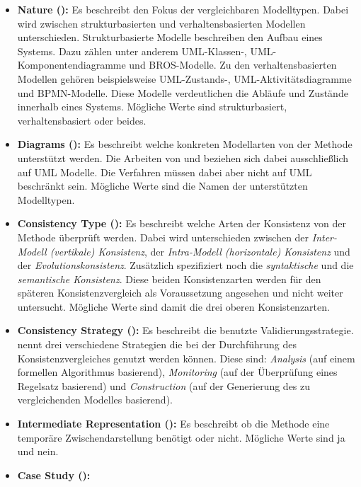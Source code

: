 \begin{itemize}
    \item \textbf{Nature (\cite{Usman2008}):}
    Es beschreibt den Fokus der vergleichbaren Modelltypen.
    Dabei wird zwischen strukturbasierten und verhaltensbasierten Modellen unterschieden.
    Strukturbasierte Modelle beschreiben den Aufbau eines Systems. Dazu zählen unter anderem UML-Klassen-, UML-Komponentendiagramme und BROS-Modelle.
    Zu den verhaltensbasierten Modellen gehören beispielsweise UML-Zustands-, UML-Aktivitätsdiagramme und BPMN-Modelle.
    Diese Modelle verdeutlichen die Abläufe und Zustände innerhalb eines Systems.
    Mögliche Werte sind strukturbasiert, verhaltensbasiert oder beides.
    \item \textbf{Diagrams (\cite{Usman2008}):}
    Es beschreibt welche konkreten Modellarten von der Methode unterstützt werden.
    Die Arbeiten von \cite{Usman2008} und \cite{Lucas2009} beziehen sich dabei ausschließlich auf UML Modelle.
    Die Verfahren müssen dabei aber nicht auf UML beschränkt sein.
    Mögliche Werte sind die Namen der unterstützten Modelltypen.
    \item \textbf{Consistency Type (\cite{Usman2008}):}
    Es beschreibt welche Arten der Konsistenz von der Methode überprüft werden.
    Dabei wird unterschieden zwischen der \emph{Inter-Modell (vertikale) Konsistenz}, der \emph{Intra-Modell (horizontale) Konsistenz} und der \emph{Evolutionskonsistenz}.
    Zusätzlich spezifiziert \cite{Usman2008} noch die \emph{syntaktische} und die \emph{semantische Konsistenz}.
    Diese beiden Konsistenzarten werden für den späteren Konsistenzvergleich als Voraussetzung angesehen und nicht weiter untersucht.
    Mögliche Werte sind damit die drei oberen Konsistenzarten.
    \item \textbf{Consistency Strategy (\cite{Usman2008}):}
    Es beschreibt die benutzte Validierungsstrategie.
    \cite{Usman2008} nennt drei verschiedene Strategien die bei der Durchführung des Konsistenzvergleiches genutzt werden können.
    Diese sind: \emph{Analysis} (auf einem formellen Algorithmus basierend), \emph{Monitoring} (auf der Überprüfung eines Regelsatz basierend) und \emph{Construction} (auf der Generierung des zu vergleichenden Modelles basierend).
    \item \textbf{Intermediate Representation (\cite{Usman2008}):}
    Es beschreibt ob die Methode eine temporäre Zwischendarstellung benötigt oder nicht.
    Mögliche Werte sind ja und nein. 
    \item \textbf{Case Study (\cite{Usman2008}):}

\end{itemize}
